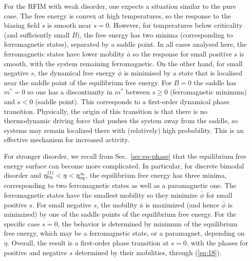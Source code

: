 \documentclass{iopart}
\newcommand{\eqref}[1]{(\ref{#1})}
\begin{document}
For the RFIM with weak disorder, one expects a situation similar to the pure case.  The free energy is convex at  high temperatures, so the response to the biasing field $s$ is smooth near $s=0$.  However, for temperatures below criticality (and sufficiently small $B$), the free energy has two minima (corresponding to ferromagnetic states), separated by a saddle point.  In all cases analysed here, the ferromagnetic states have lower mobility $\bar a$ so the response for small positive $s$ is smooth, with the system remaining ferromagnetic.  On the other hand, for small negative $s$, the dynamical free energy $\bar\phi$ is minimised by a state that is localised near the saddle point of the equilibrium free energy.  For $B=0$ the saddle has $m^{\ast}=0$ so one has a discontinuity in $m^{\ast}$ between $s\geq0$ (ferromagnetic minimum) and $s<0$ (saddle point).  This corresponds to a first-order dynamical phase transition.  Physically, the origin of this transition is that there is no thermodynamic driving force that pushes the system away from the saddle, so systems may remain localized there with (relatively) high probability.  This is an effective mechanism for increased activity.

For stronger disorder, we recall from Sec.~\ref{sec:eq-phase} that the equilibrium free energy surface can become more complicated. In particular, for discrete bimodal disorder and $\eta_{\rm eq}^{(t)} < \eta < \eta_{\rm eq}^{\infty}$, the equilibrium free energy has three minima, corresponding to two ferromagnetic states as well as a paramagnetic one.  
The ferromagnetic states have the smallest mobility so they minimize $\bar\phi$ for small positive $s$.  For small negative $s$, the mobility $\bar a$ is maximized (and hence $\bar\phi$ is minimized) by one of the saddle points of the equilibrium free energy.  For the specific case $s=0$, the behavior is determined by minimum of the equilibrium free energy, which may be a ferromagnetic state, or a paramagnet, depending on $\eta$.  Overall, the result is a first-order phase transition at $s=0$, with the phases for positive and negative $s$ determined by their mobilities, through (\ref{eq:18}).

\end{document}
